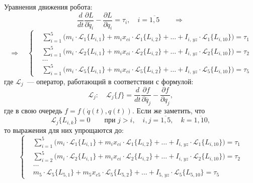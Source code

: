Уравнения движения робота:
\begin{equation}
    \frac{d}{dt}\frac{\partial L}{\partial\dot{q_i}} - \frac{\partial L}{\partial q_i} = \tau_i, \quad i = \overline{1,5} \qquad \Rightarrow
\end{equation}
\begin{equation}
    \Rightarrow \quad
	\left\{
	\begin{aligned}
		\!&\sum_{i=1}^5 \bigl( m_i \cdot \mathcal{L}_1 \{L_{i,1}\} + m_i x_{ci} \cdot \mathcal{L}_1 \{L_{i,2}\} + \ldots + I_{i,\,yz} \cdot \mathcal{L}_1 \{L_{i,10}\} \bigr) = \tau_1\\
		\!&\sum_{i=1}^5 \bigl( m_i \cdot \mathcal{L}_2 \{L_{i,1}\} + m_i x_{ci} \cdot \mathcal{L}_2 \{L_{i,2}\} + \ldots + I_{i,\,yz} \cdot \mathcal{L}_2 \{L_{i,10}\} \bigr) = \tau_2\\
		\!&\ldots\\
		\!&\sum_{i=1}^5 \bigl( m_i \cdot \mathcal{L}_5 \{L_{i,1}\} + m_i x_{ci} \cdot \mathcal{L}_5 \{L_{i,2}\} + \ldots + I_{i,\,yz} \cdot \mathcal{L}_5 \{L_{i,10}\} \bigr) = \tau_5
	\end{aligned}
	\right.
\end{equation}
где $\mathcal{L}_j$~--- оператор, работающий в соответствии с формулой:
\begin{equation}
    \mathcal{L}_j : \quad \mathcal{L}_j \{f\} = \frac{d}{dt}\frac{\partial f}{\partial\dot{q_j}} - \frac{\partial f}{\partial q_j},
\end{equation}
где в свою очередь $f = f(\dot{q}(t), q(t))$.
Если же заметить, что
\begin{equation}
    \mathcal{L}_j \{L_{i,k}\} = 0 \qquad \text{при }j > i, \quad i,j=\overline{1,5}, \quad k=\overline{1,10},
\end{equation}
то выражения для них упрощаются до:
\begin{equation}
	\left\{
	\begin{aligned}
		\!&\sum_{i=1}^5 \bigl( m_i \cdot \mathcal{L}_1 \{L_{i,1}\} + m_i x_{ci} \cdot \mathcal{L}_1 \{L_{i,2}\} + \ldots + I_{i,\,yz} \cdot \mathcal{L}_1 \{L_{i,10}\} \bigr) = \tau_1\\
		\!&\sum_{i=2}^5 \bigl( m_i \cdot \mathcal{L}_2 \{L_{i,1}\} + m_i x_{ci} \cdot \mathcal{L}_2 \{L_{i,2}\} + \ldots + I_{i,\,yz} \cdot \mathcal{L}_2 \{L_{i,10}\} \bigr) = \tau_2\\
		\!&\ldots\\
		\!& m_5 \cdot \mathcal{L}_5 \{L_{5,1}\} + m_5 x_{c5} \cdot \mathcal{L}_5 \{L_{5,2}\} + \ldots + I_{5,\,yz} \cdot \mathcal{L}_5 \{L_{5,10}\} = \tau_5
	\end{aligned}
	\right.
\end{equation}
